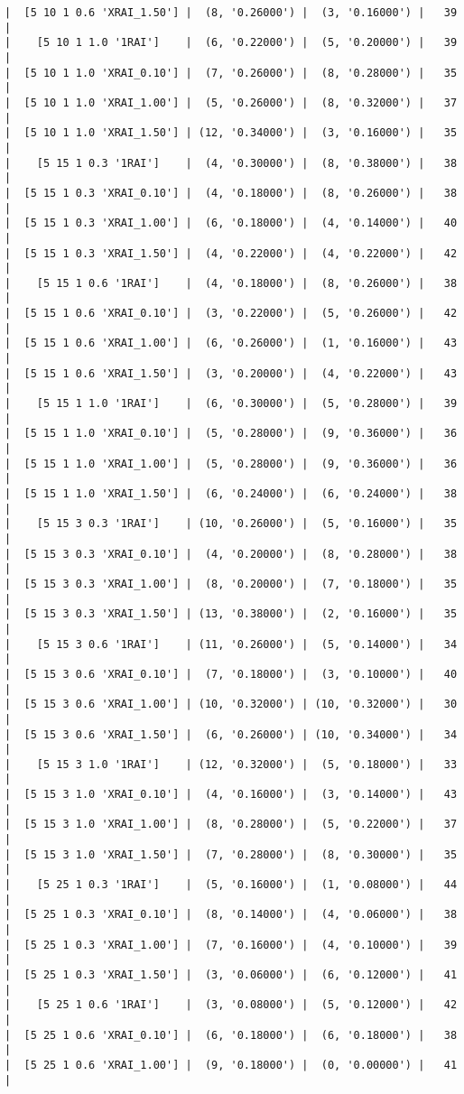 \documentclass{article}
\begin{document}
\begin{verbatim}
|  [5 10 1 0.6 'XRAI_1.50'] |  (8, '0.26000') |  (3, '0.16000') |   39  |
|    [5 10 1 1.0 '1RAI']    |  (6, '0.22000') |  (5, '0.20000') |   39  |
|  [5 10 1 1.0 'XRAI_0.10'] |  (7, '0.26000') |  (8, '0.28000') |   35  |
|  [5 10 1 1.0 'XRAI_1.00'] |  (5, '0.26000') |  (8, '0.32000') |   37  |
|  [5 10 1 1.0 'XRAI_1.50'] | (12, '0.34000') |  (3, '0.16000') |   35  |
|    [5 15 1 0.3 '1RAI']    |  (4, '0.30000') |  (8, '0.38000') |   38  |
|  [5 15 1 0.3 'XRAI_0.10'] |  (4, '0.18000') |  (8, '0.26000') |   38  |
|  [5 15 1 0.3 'XRAI_1.00'] |  (6, '0.18000') |  (4, '0.14000') |   40  |
|  [5 15 1 0.3 'XRAI_1.50'] |  (4, '0.22000') |  (4, '0.22000') |   42  |
|    [5 15 1 0.6 '1RAI']    |  (4, '0.18000') |  (8, '0.26000') |   38  |
|  [5 15 1 0.6 'XRAI_0.10'] |  (3, '0.22000') |  (5, '0.26000') |   42  |
|  [5 15 1 0.6 'XRAI_1.00'] |  (6, '0.26000') |  (1, '0.16000') |   43  |
|  [5 15 1 0.6 'XRAI_1.50'] |  (3, '0.20000') |  (4, '0.22000') |   43  |
|    [5 15 1 1.0 '1RAI']    |  (6, '0.30000') |  (5, '0.28000') |   39  |
|  [5 15 1 1.0 'XRAI_0.10'] |  (5, '0.28000') |  (9, '0.36000') |   36  |
|  [5 15 1 1.0 'XRAI_1.00'] |  (5, '0.28000') |  (9, '0.36000') |   36  |
|  [5 15 1 1.0 'XRAI_1.50'] |  (6, '0.24000') |  (6, '0.24000') |   38  |
|    [5 15 3 0.3 '1RAI']    | (10, '0.26000') |  (5, '0.16000') |   35  |
|  [5 15 3 0.3 'XRAI_0.10'] |  (4, '0.20000') |  (8, '0.28000') |   38  |
|  [5 15 3 0.3 'XRAI_1.00'] |  (8, '0.20000') |  (7, '0.18000') |   35  |
|  [5 15 3 0.3 'XRAI_1.50'] | (13, '0.38000') |  (2, '0.16000') |   35  |
|    [5 15 3 0.6 '1RAI']    | (11, '0.26000') |  (5, '0.14000') |   34  |
|  [5 15 3 0.6 'XRAI_0.10'] |  (7, '0.18000') |  (3, '0.10000') |   40  |
|  [5 15 3 0.6 'XRAI_1.00'] | (10, '0.32000') | (10, '0.32000') |   30  |
|  [5 15 3 0.6 'XRAI_1.50'] |  (6, '0.26000') | (10, '0.34000') |   34  |
|    [5 15 3 1.0 '1RAI']    | (12, '0.32000') |  (5, '0.18000') |   33  |
|  [5 15 3 1.0 'XRAI_0.10'] |  (4, '0.16000') |  (3, '0.14000') |   43  |
|  [5 15 3 1.0 'XRAI_1.00'] |  (8, '0.28000') |  (5, '0.22000') |   37  |
|  [5 15 3 1.0 'XRAI_1.50'] |  (7, '0.28000') |  (8, '0.30000') |   35  |
|    [5 25 1 0.3 '1RAI']    |  (5, '0.16000') |  (1, '0.08000') |   44  |
|  [5 25 1 0.3 'XRAI_0.10'] |  (8, '0.14000') |  (4, '0.06000') |   38  |
|  [5 25 1 0.3 'XRAI_1.00'] |  (7, '0.16000') |  (4, '0.10000') |   39  |
|  [5 25 1 0.3 'XRAI_1.50'] |  (3, '0.06000') |  (6, '0.12000') |   41  |
|    [5 25 1 0.6 '1RAI']    |  (3, '0.08000') |  (5, '0.12000') |   42  |
|  [5 25 1 0.6 'XRAI_0.10'] |  (6, '0.18000') |  (6, '0.18000') |   38  |
|  [5 25 1 0.6 'XRAI_1.00'] |  (9, '0.18000') |  (0, '0.00000') |   41  |

\end{verbatim}
\end{document}
